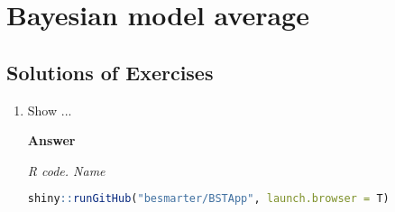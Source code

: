 \chapter{Bayesian model average}\label{chap10}

\section{Solutions of Exercises}\label{sec101}
\begin{enumerate}[leftmargin=*]

	\item Show ...
	
	\textbf{Answer}
	
	\begin{tcolorbox}[enhanced,width=4.67in,center upper,
		fontupper=\large\bfseries,drop shadow southwest,sharp corners]
		\textit{R code. Name}
		\begin{VF}
			\begin{lstlisting}[language=R]
	shiny::runGitHub("besmarter/BSTApp", launch.browser = T)\end{lstlisting}
		\end{VF}
	\end{tcolorbox} 
	
\end{enumerate}